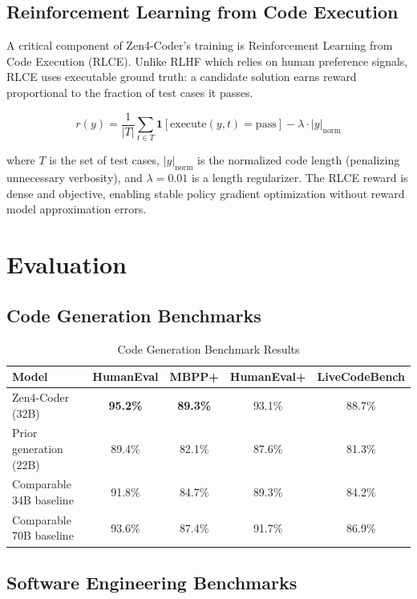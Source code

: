 \documentclass[11pt,a4paper]{article}
\begin{document}
\subsection{Reinforcement Learning from Code Execution}

A critical component of Zen4-Coder's training is Reinforcement Learning from Code Execution (RLCE). Unlike RLHF which relies on human preference signals, RLCE uses executable ground truth: a candidate solution earns reward proportional to the fraction of test cases it passes.

\begin{equation}
  r(y) = \frac{1}{|T|} \sum_{t \in T} \mathbf{1}[\text{execute}(y, t) = \text{pass}] - \lambda \cdot |y|_{\text{norm}}
\end{equation}

where $T$ is the set of test cases, $|y|_{\text{norm}}$ is the normalized code length (penalizing unnecessary verbosity), and $\lambda = 0.01$ is a length regularizer. The RLCE reward is dense and objective, enabling stable policy gradient optimization without reward model approximation errors.

\section{Evaluation}

\subsection{Code Generation Benchmarks}

\begin{table}[H]
\centering
\caption{Code Generation Benchmark Results}
\begin{tabular}{lcccc}
\toprule
\textbf{Model} & \textbf{HumanEval} & \textbf{MBPP+} & \textbf{HumanEval+} & \textbf{LiveCodeBench} \\
\midrule
Zen4-Coder (32B) & \textbf{95.2\%} & \textbf{89.3\%} & 93.1\% & 88.7\% \\
Prior generation (22B) & 89.4\% & 82.1\% & 87.6\% & 81.3\% \\
Comparable 34B baseline & 91.8\% & 84.7\% & 89.3\% & 84.2\% \\
Comparable 70B baseline & 93.6\% & 87.4\% & 91.7\% & 86.9\% \\
\bottomrule
\end{tabular}
\end{table}

\subsection{Software Engineering Benchmarks}
\end{document}
